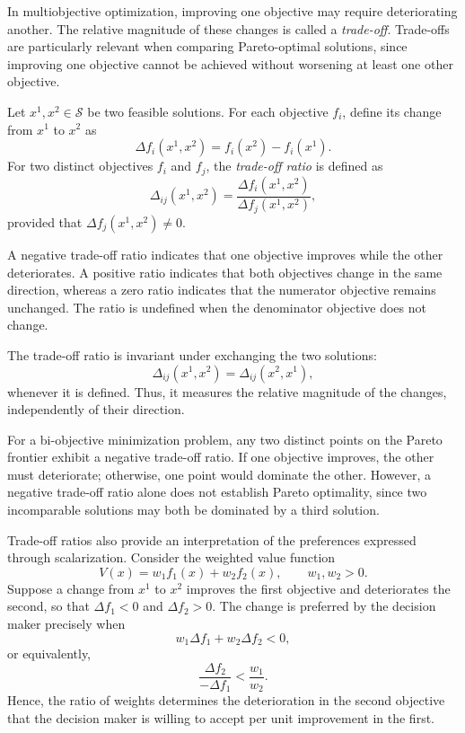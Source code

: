 In multiobjective optimization, improving one objective may require deteriorating another. The relative magnitude of these changes is called a \emph{trade-off}. Trade-offs are particularly relevant when comparing Pareto-optimal solutions, since improving one objective cannot be achieved without worsening at least one other objective.

\begin{definition}
\label{def:trade_off_ratio}
Let $x^1,x^2\in\mathcal{S}$ be two feasible solutions. For each objective $f_i$, define its change from $x^1$ to $x^2$ as
\[
\Delta f_i(x^1,x^2)=f_i(x^2)-f_i(x^1).
\]
For two distinct objectives $f_i$ and $f_j$, the \emph{trade-off ratio} is defined as
\[
\Delta_{ij}(x^1,x^2)=
\frac{\Delta f_i(x^1,x^2)}
     {\Delta f_j(x^1,x^2)},
\]
provided that $\Delta f_j(x^1,x^2)\neq 0$.
\end{definition}

A negative trade-off ratio indicates that one objective improves while the other deteriorates. A positive ratio indicates that both objectives change in the same direction, whereas a zero ratio indicates that the numerator objective remains unchanged. The ratio is undefined when the denominator objective does not change.

The trade-off ratio is invariant under exchanging the two solutions:
\[
\Delta_{ij}(x^1,x^2)=\Delta_{ij}(x^2,x^1),
\]
whenever it is defined. Thus, it measures the relative magnitude of the changes, independently of their direction.

For a bi-objective minimization problem, any two distinct points on the Pareto frontier exhibit a negative trade-off ratio. If one objective improves, the other must deteriorate; otherwise, one point would dominate the other. However, a negative trade-off ratio alone does not establish Pareto optimality, since two incomparable solutions may both be dominated by a third solution.

Trade-off ratios also provide an interpretation of the preferences expressed through scalarization. Consider the weighted value function
\[
V(x)=w_1f_1(x)+w_2f_2(x),
\qquad w_1,w_2>0.
\]
Suppose a change from $x^1$ to $x^2$ improves the first objective and deteriorates the second, so that $\Delta f_1<0$ and $\Delta f_2>0$. The change is preferred by the decision maker precisely when
\[
w_1\Delta f_1+w_2\Delta f_2<0,
\]
or equivalently,
\[
\frac{\Delta f_2}{-\Delta f_1}<\frac{w_1}{w_2}.
\]
Hence, the ratio of weights determines the deterioration in the second objective that the decision maker is willing to accept per unit improvement in the first.

